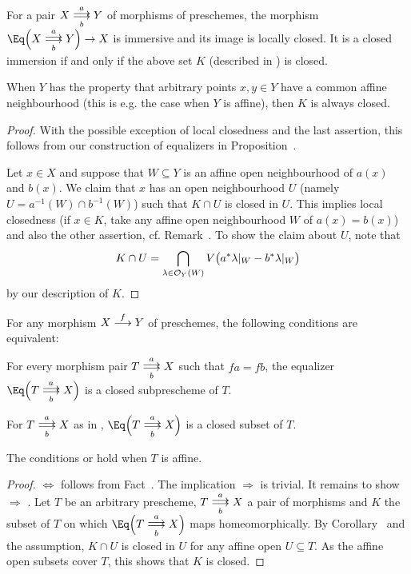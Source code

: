 \documentclass[a4paper,parskip=half,numbers=enddot, DIV=12]{scrreprt}
\begin{document}
\begin{fact}
	For a pair $X\doublemorphism[a][b]Y$ of morphisms of preschemes, the morphism $\Eq\Big(X\doublemorphism[a][b]Y\Big)\morphism X$ is immersive and its image is locally closed. It is a closed immersion if and only if the above set $K$ (described in ) is closed.
	
	When $Y$ has the property that arbitrary points $x,y\in Y$ have a common affine neighbourhood (this is e.g. the case when $Y$ is affine), then $K$ is always closed.
\end{fact}
\begin{proof}
	With the possible exception of local closedness and the last assertion, this follows from our construction of equalizers in Proposition~. 
	
	Let $x\in X$ and suppose that $W\subseteq Y$ is an affine open neighbourhood of $a(x)$ and $b(x)$. We claim that $x$ has an open neighbourhood $U$ (namely $U=a^{-1}(W)\cap b^{-1}(W)$) such that $K\cap U$ is closed in $U$. This implies local closedness (if $x\in K$, take any affine open neighbourhood $W$ of $a(x)=b(x)$) and also the other assertion, cf. Remark~. To show the claim about $U$, note that
	\begin{align*}
		K\cap U=\bigcap_{\lambda\in\mathcal{O}_Y(W)}V\big(a^*\lambda|_W-b^*\lambda|_W\big)
	\end{align*}
	by our description of $K$.
\end{proof}
\begin{fact}
	For any morphism $X\morphism[f]Y$ of preschemes, the following conditions are equivalent:
	\begin{alphanumerate}
		\item For every morphism pair $T\doublemorphism[a][b] X$ such that $fa=fb$, the equalizer $\Eq\Big(T\doublemorphism[a][b]X\Big)$ is a closed subprescheme of $T$.
		\item For $T\doublemorphism[a][b] X$ as in , $\Eq\Big(T\doublemorphism[a][b]X\Big)$ is a closed subset of $T$.
		\item The conditions  or  hold when $T$ is affine.
	\end{alphanumerate}
\end{fact}
\begin{proof}
	 $\Leftrightarrow$  follows from Fact~. The implication  $\Rightarrow$  is trivial. It remains to show  $\Rightarrow$ . Let $T$ be an arbitrary prescheme, $T\doublemorphism[a][b]X$ a pair of morphisms and $K$ the subset of $T$ on which $\smash{\Eq\Big(}T\doublemorphism[\smash{a}][b]X\smash{\Big)}$ maps homeomorphically. By Corollary~ and the assumption, $K\cap U$ is closed in $U$ for any affine open $U\subseteq T$. As the affine open subsets cover $T$, this shows that $K$ is closed.
\end{proof}
\end{document}
